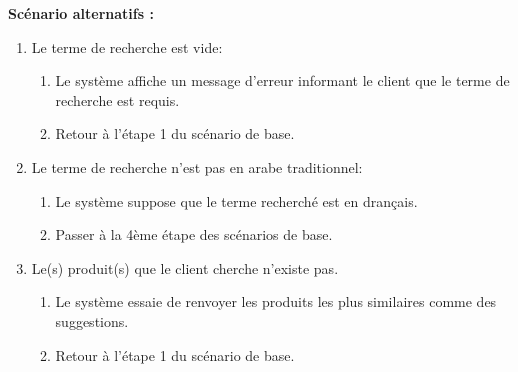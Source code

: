 \newpage
\textbf{Scénario alternatifs : }
\begin{enumerate}
	\item Le terme de recherche est vide:
	      \begin{enumerate}
		      \item Le système affiche un message d'erreur informant le client que le terme de recherche est requis.
		      \item Retour à l'étape 1 du scénario de base.
	      \end{enumerate}
	\item Le terme de recherche n'est pas en arabe traditionnel:
	      \begin{enumerate}
		      \item Le système suppose que le terme recherché est en drançais.
		      \item Passer à la 4ème étape des scénarios de base.
	      \end{enumerate}
	\item Le(s) produit(s) que le client cherche n'existe pas.
	      \begin{enumerate}
		      \item Le système essaie de renvoyer les produits les plus similaires comme des suggestions.
		      \item Retour à l'étape 1 du scénario de base.
	      \end{enumerate}
\end{enumerate}

